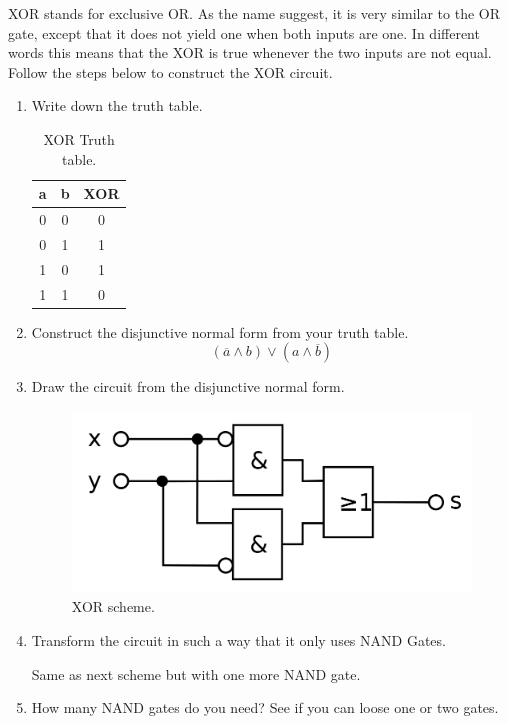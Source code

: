 \documentclass[10pt,a4paper]{article}
\begin{document}
	XOR stands for exclusive OR. As the name suggest, it is very similar to the OR gate, except that it does not yield one when both inputs are one. In different words this means that the XOR is true whenever the two inputs are not equal. Follow the steps below to construct the XOR circuit.
	\begin{enumerate}
		\item Write down the truth table.
			\begin{table}[H]
			\centering
			\begin{tabular}{|c|c|c|}
				\hline
				a & b & XOR \\ \hline
				0 & 0 & 0   \\ \hline
				0 & 1 & 1   \\ \hline
				1 & 0 & 1   \\ \hline
				1 & 1 & 0   \\ \hline
			\end{tabular}
			\caption{XOR Truth table.}
			\label{tab:xor-truht-table}
		\end{table}
		\item\label{it:1} Construct the disjunctive normal form from your truth table.
		\[
		(\overline{a} \land b) \lor (a \land \overline{b})
		\]
		\item Draw the circuit from the disjunctive normal form.
		\begin{figure}[H]
			\centering		  
			\includegraphics[scale=0.3]{xor-scheme}
			\caption{XOR scheme.}
			\label{fig:xor-scheme}
		\end{figure}
		\item Transform the circuit in such a way that it only uses NAND Gates.
		\begin{center}
			Same as next scheme but with one more NAND gate.
		\end{center}
		\item How many NAND gates do you need? See if you can loose one or two gates.
		\begin{figure}[H]

\end{figure}
\end{enumerate}
\end{document}
